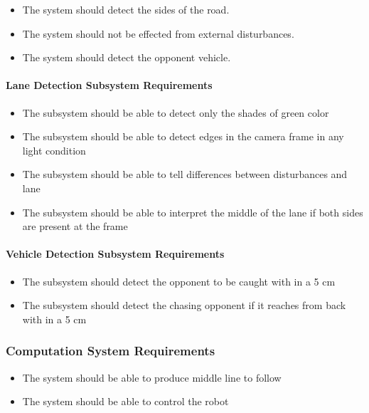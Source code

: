 \documentclass[a4paper,12pt]{article}
\begin{document}
		\begin{itemize}
			\item The system should detect the sides of the road.
			\item The system should not be effected from external disturbances.
			\item The system should detect the opponent vehicle.
		\end{itemize}

	\paragraph{Lane Detection Subsystem Requirements}	
		
		\begin{itemize}
			\item The subsystem should be able to detect only the shades of green color
			\item The subsystem should be able to detect edges in the camera frame in any light condition
			\item The subsystem should be able to tell differences between disturbances and lane
			\item The subsystem should be able to interpret the middle of the lane if both sides are present at the frame
		\end{itemize}
	 
	 
	\paragraph{Vehicle Detection Subsystem Requirements}
	
		\begin{itemize}
			\item The subsystem should detect the opponent to be caught with in a 5 cm 
			\item The subsystem should detect the chasing opponent if it reaches from back with in a 5 cm  
		\end{itemize}
		
		
	\subsubsection{Computation System Requirements}
		
		\begin{itemize}
			\item The system should	be able to produce middle line to follow
			\item The system should be able to control the robot
		\end{itemize}			
	
\end{document}
